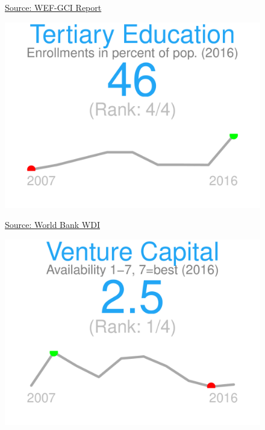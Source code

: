 \documentclass{article}\usepackage[]{graphicx}\usepackage[]{color}
\makeatletter
\def\maxwidth{ %
  \ifdim\Gin@nat@width>\linewidth
    \linewidth
  \else
    \Gin@nat@width
  \fi
}
\makeatother
\begin{document}
\begin{figure}
\begin{minipage}[t]{0.99\textwidth}
\begin{minipage}[t]{0.56\textwidth}
\begin{minipage}[c]{0.30\textwidth}
{}



    \vspace{-2ex}
    \hspace{2ex}\tiny{\href{http://www3.weforum.org/docs/gcr/2015-2016/GCI_Dataset_2006-2015.xlsx}{\textcolor[HTML]{22A6F5}{Source: WEF-GCI Report}}}
    \end{minipage}
    \begin{minipage}[c]{0.30\textwidth}


{\centering \includegraphics[width=\maxwidth]{figure/figure_sparkline5-1} 

}



    \vspace{-2ex}
    \hspace{2ex}\tiny{\href{http://data.worldbank.org}{\textcolor[HTML]{22A6F5}{Source: World Bank WDI}}}
    \end{minipage}
    \begin{minipage}[c]{0.30\textwidth}


{\centering \includegraphics[width=\maxwidth]{figure/figure_sparkline6-1} 

}
\end{minipage}
\end{minipage}
\end{minipage}
\end{figure}
\end{document}

